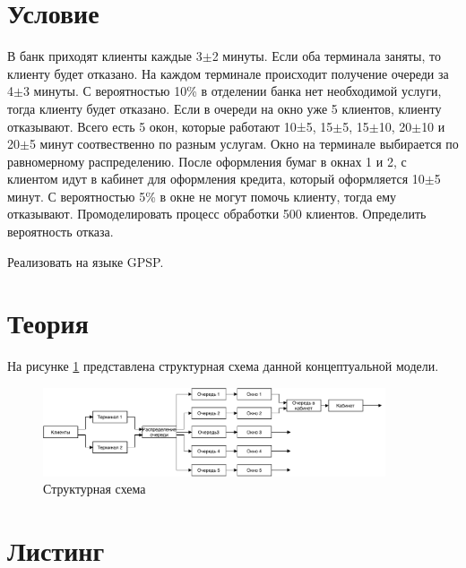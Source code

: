 \section{Условие}

В банк приходят клиенты каждые 3$\pm$2 минуты. Если оба терминала заняты, то клиенту будет отказано. На каждом терминале происходит получение очереди за 4$\pm$3 минуты. С вероятностью 10\% в отделении банка нет необходимой услуги, тогда клиенту будет отказано. Если в очереди на окно уже 5 клиентов, клиенту отказывают. Всего есть 5 окон, которые работают 10±5, 15$\pm$5, 15$\pm$10, 20$\pm$10 и 20$\pm$5 минут соотвественно по разным услугам. Окно на терминале выбирается по равномерному распределению. После оформления бумаг в окнах 1 и 2, с клиентом идут в кабинет для оформления кредита, который оформляется 10$\pm$5 минут. С вероятностью 5\% в окне не могут помочь клиенту, тогда ему отказывают. Промоделировать процесс обработки 500 клиентов. Определить вероятность отказа.

Реализовать на языке GPSP.

\section{Теория}

На рисунке \ref{fig:model} представлена структурная схема  данной концептуальной модели.

\begin{figure}[H]
    \centering
    \includegraphics[width=0.9\textwidth]{img/content/model.pdf}
    \caption{Структурная схема}
    \label{fig:model}
\end{figure}

\section{Листинг}


